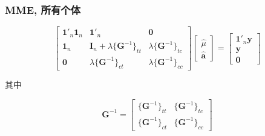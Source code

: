 \documentclass[serif,aspectratio=169]{beamer}
\begin{document}
\begin{frame}
  \frametitle{MME, 所有个体}
  $$
  \left[\begin{array}{ccc}
      \mathbf{1}'_n\mathbf{1}_n & \mathbf{1}'_n & \mathbf{0}\\
      \mathbf{1}_n & \mathbf{I}_n+\lambda\{\mathbf{G}^{-1}\}_{tt} & \lambda\{\mathbf{G}^{-1}\}_{tc}\\
      \mathbf{0} & \lambda\{\mathbf{G}^{-1}\}_{ct} & \lambda\{\mathbf{G}^{-1}\}_{cc}
    \end{array}\right]
  \left[\begin{array}{c}
      \hat{\mu}\\\hat{\mathbf{a}}
    \end{array}\right]=
  \left[\begin{array}{c}
      \mathbf{1}'_n\mathbf{y}\\\mathbf{y}\\\mathbf{0}
    \end{array}\right]
  $$

  其中

  $$
  \mathbf{G}^{-1}=\left[\begin{array}{cc}
      \{\mathbf{G}^{-1}\}_{tt} & \{\mathbf{G}^{-1}\}_{tc}\\
      \{\mathbf{G}^{-1}\}_{ct} & \{\mathbf{G}^{-1}\}_{cc}
    \end{array}\right]
  $$
      
\end{frame}
\end{document}
